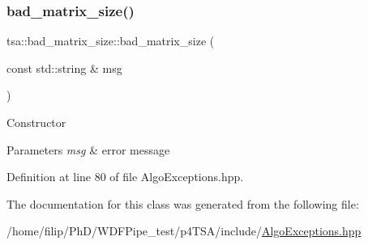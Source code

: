 \subsubsection{\texorpdfstring{bad\+\_\+matrix\+\_\+size()}{bad\_matrix\_size()}}
{\footnotesize\ttfamily tsa\+::bad\+\_\+matrix\+\_\+size\+::bad\+\_\+matrix\+\_\+size (\begin{DoxyParamCaption}\item[{const std\+::string \&}]{msg }\end{DoxyParamCaption})\hspace{0.3cm}{\ttfamily [inline]}}

Constructor


\begin{DoxyParams}{Parameters}
{\em msg} & error message \\
\hline
\end{DoxyParams}


Definition at line 80 of file Algo\+Exceptions.\+hpp.



The documentation for this class was generated from the following file\+:\begin{DoxyCompactItemize}
\item 
/home/filip/\+Ph\+D/\+W\+D\+F\+Pipe\+\_\+test/p4\+T\+S\+A/include/\hyperlink{_algo_exceptions_8hpp}{Algo\+Exceptions.\+hpp}\end{DoxyCompactItemize}
